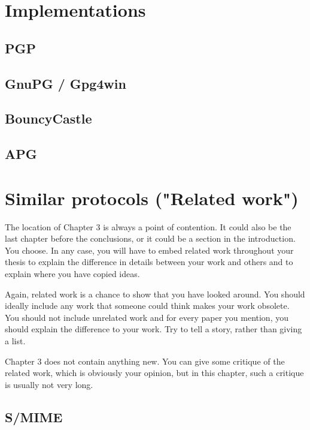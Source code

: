 \section{Implementations}

\subsection{PGP}

\subsection{GnuPG / Gpg4win}

\subsection{BouncyCastle}

\subsection{APG}

\section{Similar protocols ("Related work")}

The location of Chapter 3 is always a point of contention. It
could also be the last chapter before the conclusions, or it could
be a section in the introduction. You choose. In any case, you will
have to embed related work throughout your thesis to explain
the difference in details between your work and others and to
explain where you have copied ideas.

Again, related work is a chance to show that you have looked
around. You should ideally include any work that someone could
think makes your work obsolete. You should not include unrelated
work and for every paper you mention, you should explain the
difference to your work. Try to tell a story, rather than giving a
list.

Chapter 3 does not contain anything new. You can give some critique
of the related work, which is obviously your opinion, but in this
chapter, such a critique is usually not very long.

\subsection{S/MIME}